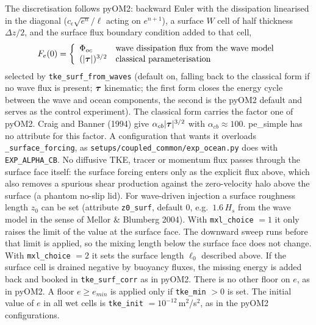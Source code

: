\documentclass[12pt]{article}
\newcommand{\beq}  { \begin{eqnarray} }
\newcommand{\eeq}  { \end{eqnarray}}
\renewcommand{\v}[1]{{\mbox{\boldmath$ #1 $}}}  %
\begin{document}
The discretisation follows pyOM2: backward Euler with the dissipation
linearised in the diagonal ($c_\epsilon \sqrt{e^n}/\ell$ acting on
$e^{n+1}$), a surface $W$ cell of half thickness $\Delta z/2$, and the
surface flux boundary condition added to that cell,
\beq
 F_e(0) = \left\{
 \begin{array}{ll}
   \Phi_{oc} & \mbox{wave dissipation flux from the wave model} \\
   (|\v \tau|)^{3/2} & \mbox{classical parameterisation}
 \end{array} \right.
\eeq
selected by \verb|tke_surf_from_waves| (default on, falling back to the
classical form if no wave flux is present; $\v \tau$ kinematic; the first
form closes the energy cycle between the wave and ocean components, the
second is the pyOM2 default and serves as the control experiment).
The classical form carries the factor one of pyOM2.
Craig and Banner (1994) give $\alpha_{cb} |\v \tau|^{3/2}$ with $\alpha_{cb} \approx 100$.
pe\_simple has no attribute for this factor.
A configuration that wants it overloads \verb|_surface_forcing|,
as \verb|setups/coupled_common/exp_ocean.py| does with \verb|EXP_ALPHA_CB|. No
diffusive TKE, tracer or momentum flux passes through the surface face
itself: the surface forcing enters only as the explicit flux above, which
also removes a spurious shear production against the zero-velocity halo
above the surface (a phantom no-slip lid).
For wave-driven injection a surface roughness length $z_0$ can be set
(attribute \verb|z0_surf|, default $0$, e.g.\
$1.6\,H_s$ from the wave model in the sense of Mellor \& Blumberg 2004).
With \verb|mxl_choice| $=1$ it only raises the limit of the value at the surface face.
The downward sweep runs before that limit is applied, so the mixing length below the surface face does not change.
With \verb|mxl_choice| $=2$ it sets the surface length $\ell_0$ described above.
If the
surface cell is drained negative by buoyancy fluxes, the missing energy is
added back and booked in \verb|tke_surf_corr| as in pyOM2.
There is no other floor on $e$, as in pyOM2.
A floor $e \ge e_{min}$ is applied only if \verb|tke_min| $> 0$ is set.
The initial value of $e$ in all wet cells is \verb|tke_init| $= 10^{-12}\,$m$^2$/s$^2$, as in the pyOM2 configurations.
\end{document}
